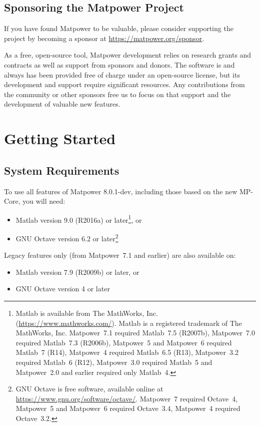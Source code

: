 \documentclass[12pt]{article}
\newcommand{\mpver}[0]{8.0.1-dev}
\newcommand{\matlab}[0]{{\sc Matlab}}
\newcommand{\matpower}[0]{{\sc Matpower}}
\newcommand{\mpcore}{{MP-Core}}
\numberwithin{equation}{section}
\numberwithin{table}{section}
\numberwithin{figure}{section}
\begin{document}
\subsection{Sponsoring the \matpower{} Project}
\label{sec:sponsor}

If you have found \matpower{} to be valuable, please consider supporting the project by becoming a sponsor at \url{https://matpower.org/sponsor}.

As a free, open-source tool, \matpower{} development relies on research grants and contracts as well as support from sponsors and donors. The software is and always has been provided free of charge under an open-source license, but its development and support require significant resources. Any contributions from the community or other sponsors free us to focus on that support and the development of valuable new features.

\clearpage
\section{Getting Started}


\subsection{System Requirements}
\label{sec:sysreq}
To use all features of \matpower{} \mpver{}, including those based on the new \mpcore{}, you will need:
\begin{itemize}
\item \matlab{}\textsuperscript{\tiny \textregistered} version 9.0 (R2016a) or later\footnote{\matlab{} is available from The MathWorks, Inc. (\url{https://www.mathworks.com/}). \matlab{} is a registered trademark of The MathWorks, Inc. \matpower{}~7.1 required \matlab{}~7.5 (R2007b), \matpower{}~7.0 required \matlab{}~7.3 (R2006b), \matpower{}~5 and \matpower{}~6 required \matlab{}~7 (R14), \matpower{}~4 required \matlab{}~6.5 (R13), \matpower{}~3.2 required \matlab{}~6 (R12), \matpower{}~3.0 required \matlab{}~5 and \matpower{}~2.0 and earlier required only \matlab{}~4. }, or
\item GNU Octave version 6.2 or later\footnote{GNU Octave \cite{octave} is free software, available online at \url{https://www.gnu.org/software/octave/}. \matpower{}~7 required Octave~4, \matpower{}~5 and \matpower{}~6 required Octave~3.4, \matpower{}~4 required Octave~3.2.}
\end{itemize}
Legacy features only (from \matpower{}~7.1 and earlier) are also available on:
\begin{itemize}
\item \matlab{} version 7.9 (R2009b) or later, or
\item GNU Octave version 4 or later
\end{itemize}
\end{document}
